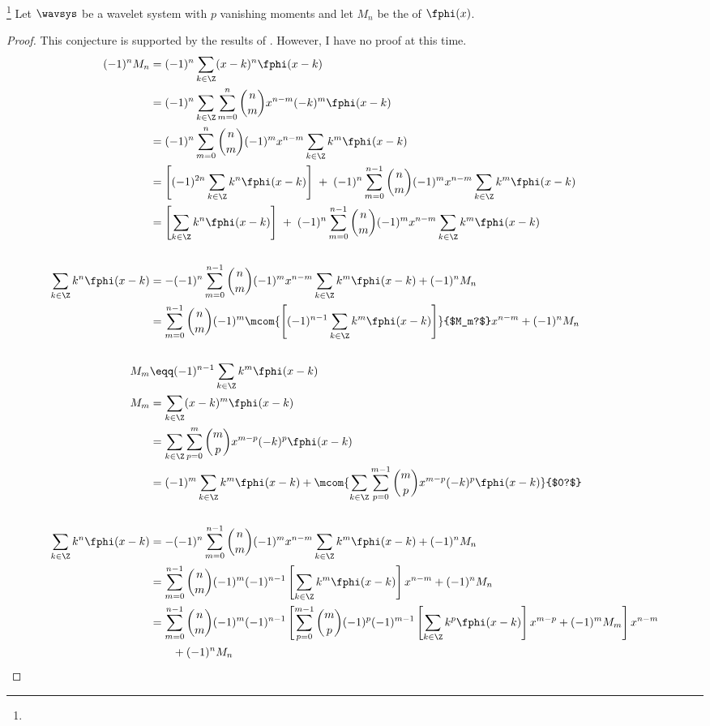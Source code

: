 \begin{conjecture}
\footnote{
  } 
\label{cnj:sfixc}
Let $\wavsys$ be a wavelet system with $p$ vanishing moments
and let $M_n$ be the   of $\fphi(x)$.
\end{conjecture}
\begin{proof}
This conjecture is supported by the results of .
However, I have no proof at this time. 
\begin{align*}
  (-1)^n M_n
    &= (-1)^n \sum_{k\in\Z} (x-k)^n  \fphi(x-k)
  \\&= (-1)^n \sum_{k\in\Z} \sum_{m=0}^n {n\choose m}x^{n-m} (-k)^m \fphi(x-k)
  \\&= (-1)^n \sum_{m=0}^n {n\choose m}(-1)^m x^{n-m} \sum_{k\in\Z} k^m \fphi(x-k)
  \\&= \left[(-1)^{2n} \sum_{k\in\Z} k^n \fphi(x-k)\right]
      \;+\; (-1)^n \sum_{m=0}^{n-1} {n\choose m}(-1)^m x^{n-m} \sum_{k\in\Z} k^m \fphi(x-k)
  \\&= \left[\sum_{k\in\Z} k^n \fphi(x-k)\right]
      \;+\; (-1)^n \sum_{m=0}^{n-1} {n\choose m}(-1)^m x^{n-m} \sum_{k\in\Z} k^m \fphi(x-k)
  \\
  \\
  \sum_{k\in\Z} k^n \fphi(x-k)
    &= -(-1)^n \sum_{m=0}^{n-1} {n\choose m}(-1)^m x^{n-m} \sum_{k\in\Z} k^m \fphi(x-k)
        + (-1)^n M_n
  \\&=  \sum_{m=0}^{n-1} {n\choose m}(-1)^m 
         \mcom{\left[(-1)^{n-1}\sum_{k\in\Z} k^m \fphi(x-k)\right]}{$M_m?$}
         x^{n-m} 
        + (-1)^n M_n
\\
\\
  M_m &\eqq (-1)^{n-1}\sum_{k\in\Z}  k^m \fphi(x-k)
\\
  M_m
    &= \sum_{k\in\Z} (x-k)^m \fphi(x-k)
  \\&= \sum_{k\in\Z} \sum_{p=0}^m {m\choose p}x^{m-p}(-k)^p \fphi(x-k)
  \\&= (-1)^m \sum_{k\in\Z} k^m \fphi(x-k)
      + \mcom{\sum_{k\in\Z} \sum_{p=0}^{m-1}{m\choose p}x^{m-p}(-k)^p \fphi(x-k)}{$0?$}
  \\
  \\
  \sum_{k\in\Z} k^n \fphi(x-k)
    &= -(-1)^n \sum_{m=0}^{n-1} {n\choose m}(-1)^m x^{n-m} \sum_{k\in\Z} k^m \fphi(x-k)
        + (-1)^n M_n
  \\&=  \sum_{m=0}^{n-1} {n\choose m}(-1)^m 
         (-1)^{n-1}\left[\sum_{k\in\Z} k^m \fphi(x-k)\right]
         x^{n-m} 
        + (-1)^n M_n
  \\&=  \sum_{m=0}^{n-1} {n\choose m}(-1)^m 
         (-1)^{n-1}
         \left[
           \sum_{p=0}^{m-1} {m\choose p}(-1)^p 
           (-1)^{m-1}\left[\sum_{k\in\Z} k^p \fphi(x-k)\right]
           x^{m-p} 
           + (-1)^m M_m
         \right]
         x^{n-m} 
        \\&\qquad+ (-1)^n M_n
\end{align*}
\end{proof}

